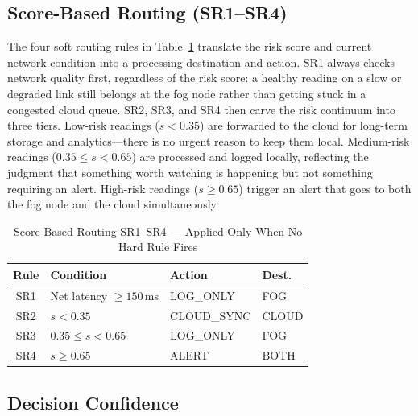 \documentclass[conference]{IEEEtran}
\begin{document}
\subsection{Score-Based Routing (SR1--SR4)}

The four soft routing rules in Table~\ref{tab:routing} translate the
risk score and current network condition into a processing destination
and action.
SR1 always checks network quality first, regardless of the risk score:
a healthy reading on a slow or degraded link still belongs at the fog
node rather than getting stuck in a congested cloud queue.
SR2, SR3, and SR4 then carve the risk continuum into three tiers.
Low-risk readings ($s < 0.35$) are forwarded to the cloud for
long-term storage and analytics---there is no urgent reason to keep
them local.
Medium-risk readings ($0.35 \leq s < 0.65$) are processed and logged
locally, reflecting the judgment that something worth watching is
happening but not something requiring an alert.
High-risk readings ($s \geq 0.65$) trigger an alert that goes to both
the fog node and the cloud simultaneously.

\begin{table}[t]
\caption{Score-Based Routing SR1--SR4 --- Applied Only When No Hard Rule Fires}
\label{tab:routing}
\centering
\small
\setlength{\tabcolsep}{4pt}
\begin{tabular}{@{}clll@{}}
\toprule
\textbf{Rule} & \textbf{Condition} & \textbf{Action} & \textbf{Dest.} \\
\midrule
SR1 & Net latency $\geq 150$\,ms        & LOG\_ONLY   & FOG   \\
SR2 & $s < 0.35$                        & CLOUD\_SYNC & CLOUD \\
SR3 & $0.35 \leq s < 0.65$              & LOG\_ONLY   & FOG   \\
SR4 & $s \geq 0.65$                     & ALERT       & BOTH  \\
\bottomrule
\end{tabular}
\end{table}

\subsection{Decision Confidence}
\end{document}
